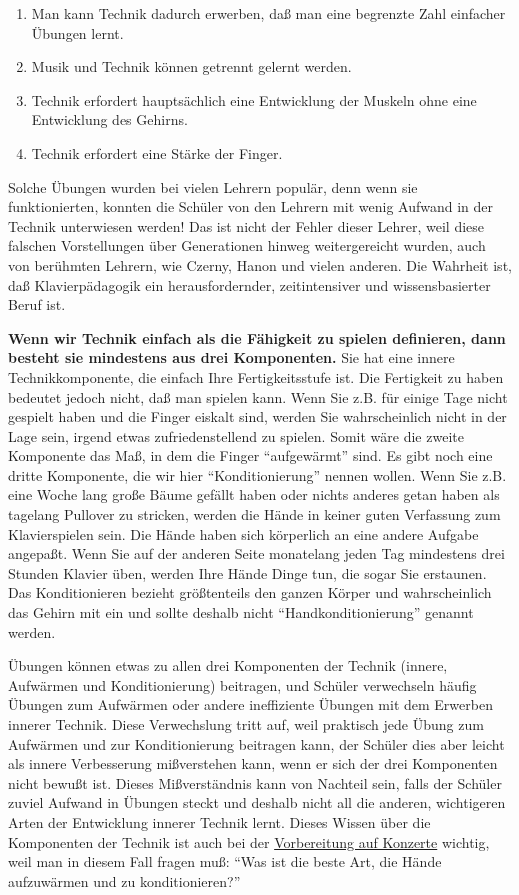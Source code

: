 \begin{enumerate}[label={\roman*.}] 
 \item Man kann Technik dadurch erwerben, daß man eine begrenzte Zahl einfacher Übungen lernt.
 \item Musik und Technik können getrennt gelernt werden.
 \item Technik erfordert hauptsächlich eine Entwicklung der Muskeln ohne eine Entwicklung des Gehirns.
 \item Technik erfordert eine Stärke der Finger.
\end{enumerate}
Solche Übungen wurden bei vielen Lehrern populär, denn wenn sie funktionierten, konnten die Schüler von den Lehrern mit wenig Aufwand in der Technik unterwiesen werden!
Das ist nicht der Fehler dieser Lehrer, weil diese falschen Vorstellungen über Generationen hinweg weitergereicht wurden, auch von berühmten Lehrern, wie Czerny, Hanon und vielen anderen.
Die Wahrheit ist, daß Klavierpädagogik ein herausfordernder, zeitintensiver und wissensbasierter Beruf ist.

\textbf{Wenn wir Technik einfach als die Fähigkeit zu spielen definieren, dann besteht sie mindestens aus drei Komponenten.}
Sie hat eine innere Technikkomponente, die einfach Ihre Fertigkeitsstufe ist.
Die Fertigkeit zu haben bedeutet jedoch nicht, daß man spielen kann.
Wenn Sie z.B. für einige Tage nicht gespielt haben und die Finger eiskalt sind, werden Sie wahrscheinlich nicht in der Lage sein, irgend etwas zufriedenstellend zu spielen.
Somit wäre die zweite Komponente das Maß, in dem die Finger \enquote{aufgewärmt} sind.
Es gibt noch eine dritte Komponente, die wir hier \enquote{Konditionierung} nennen wollen.
Wenn Sie z.B. eine Woche lang große Bäume gefällt haben oder nichts anderes getan haben als tagelang Pullover zu stricken, werden die Hände in keiner guten Verfassung zum Klavierspielen sein.
Die Hände haben sich körperlich an eine andere Aufgabe angepaßt.
Wenn Sie auf der anderen Seite monatelang jeden Tag mindestens drei Stunden Klavier üben, werden Ihre Hände Dinge tun, die sogar Sie erstaunen.
Das Konditionieren bezieht größtenteils den ganzen Körper und wahrscheinlich das Gehirn mit ein und sollte deshalb nicht \enquote{Handkonditionierung} genannt werden.

Übungen können etwas zu allen drei Komponenten der Technik (innere, Aufwärmen und Konditionierung) beitragen, und Schüler verwechseln häufig Übungen zum Aufwärmen oder andere ineffiziente Übungen mit dem Erwerben innerer Technik.
Diese Verwechslung tritt auf, weil praktisch jede Übung zum Aufwärmen und zur Konditionierung beitragen kann, der Schüler dies aber leicht als innere Verbesserung mißverstehen kann, wenn er sich der drei Komponenten nicht bewußt ist.
Dieses Mißverständnis kann von Nachteil sein, falls der Schüler zuviel Aufwand in Übungen steckt und deshalb nicht all die anderen, wichtigeren Arten der Entwicklung innerer Technik lernt.
Dieses Wissen über die Komponenten der Technik ist auch bei der \hyperref[c1iii14]{Vorbereitung auf Konzerte} wichtig, weil man in diesem Fall fragen muß: \enquote{Was ist die beste Art, die Hände aufzuwärmen und zu konditionieren?}

